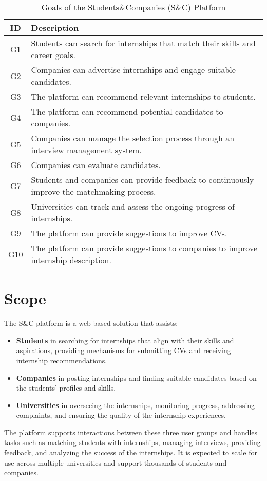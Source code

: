\begin{table}[h!]
\renewcommand{\arraystretch}{1.8}
\centering
\begin{tabular}{|c|p{12cm}|}
\hline
\textbf{ID} & \textbf{Description} \\ \hline
G1 & Students can search for internships that match their skills and career goals. \\ \hline
G2 & Companies can advertise internships and engage suitable candidates. \\ \hline
G3 & The platform can recommend relevant internships to students. \\ \hline
G4 & The platform can recommend potential candidates to companies. \\ \hline
G5 &  Companies can manage the selection process through an interview management system. \\ \hline
G6 & Companies can evaluate candidates.\\ \hline
G7 & Students and companies can provide feedback to continuously improve the matchmaking process. \\ \hline
G8 & Universities can track and assess the ongoing progress of internships. \\ \hline
G9 & The platform can provide suggestions to improve CVs. \\ \hline
G10 & The platform can provide suggestions to companies to improve internship description. \\ \hline
\end{tabular}
\caption{Goals of the Students\&Companies (S\&C) Platform}
\end{table}

\section{Scope}
The S\&C platform is a web-based solution that assists:
\begin{itemize}
    \item \textbf{Students} in searching for internships that align with their skills and aspirations, providing mechanisms for submitting CVs and receiving internship recommendations.
    \item \textbf{Companies} in posting internships and finding suitable candidates based on the students’ profiles and skills.
    \item \textbf{Universities} in overseeing the internships, monitoring progress, addressing complaints, and ensuring the quality of the internship experiences.
\end{itemize}
The platform supports interactions between these three user groups and handles tasks such as matching students with internships, managing interviews, providing feedback, and analyzing the success of the internships. It is expected to scale for use across multiple universities and support thousands of students and companies.
\newpage


